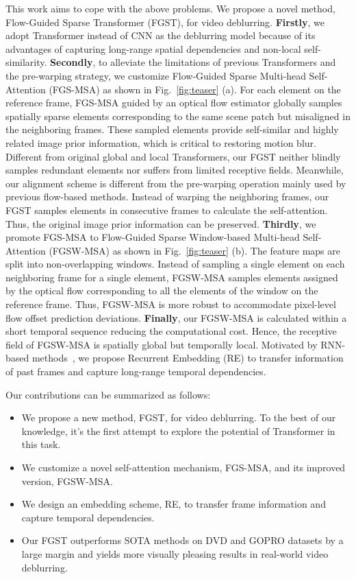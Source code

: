 \documentclass{article}
\begin{document}
	This work aims to cope with the above problems. We propose a novel method, Flow-Guided Sparse Transformer (FGST), for video deblurring. \textbf{Firstly}, we adopt Transformer instead of CNN as the deblurring model because of its advantages of capturing long-range spatial dependencies and non-local self-similarity. \textbf{Secondly}, to alleviate the limitations of previous Transformers and the pre-warping strategy, we customize Flow-Guided Sparse Multi-head Self-Attention (FGS-MSA) as shown in Fig.~\ref{fig:teaser} (a). For each  element on the reference frame, FGS-MSA guided by an optical flow estimator globally samples spatially sparse  elements corresponding to the same scene patch but misaligned in the neighboring frames. These sampled  elements provide self-similar and highly related image prior information, which is critical to restoring motion blur. Different from original global and local Transformers, our FGST neither blindly samples redundant  elements nor suffers from limited receptive fields. Meanwhile, our alignment scheme is different from the pre-warping operation mainly used by previous flow-based methods. Instead of warping the neighboring frames, our FGST samples  elements in consecutive frames to calculate the self-attention. Thus, the original image prior information can be preserved. \textbf{Thirdly}, we  promote FGS-MSA to Flow-Guided Sparse Window-based Multi-head Self-Attention (FGSW-MSA) as shown in Fig.~\ref{fig:teaser} (b). The feature maps are split into non-overlapping windows. Instead of sampling a single  element on each neighboring frame for a single  element, FGSW-MSA samples  elements assigned by the optical flow corresponding to all the  elements of the window on the reference frame. Thus, FGSW-MSA is more robust to accommodate pixel-level flow offset prediction deviations. \textbf{Finally}, our FGSW-MSA is calculated within a short temporal sequence reducing the computational cost. Hence, the receptive field of FGSW-MSA is spatially global but temporally local. Motivated by RNN-based methods~\cite{Nah,RNN_3}, we propose Recurrent Embedding (RE) to transfer information of past frames and capture long-range temporal dependencies.
	
	Our contributions can be summarized as follows:
	
	\begin{itemize}
		\setlength{\itemsep}{1pt}
		\setlength{\parsep}{1pt}
		\setlength{\parskip}{1pt}
		\vspace{-4mm}
		\item We propose a new method, FGST, for video deblurring. To the best of our knowledge, it's the first attempt to explore the potential of Transformer in this task. 
\item We customize a novel self-attention mechanism, FGS-MSA, and its improved version, FGSW-MSA.
\item We design an embedding scheme, RE, to transfer frame information and capture temporal dependencies.
\item Our FGST outperforms SOTA methods on DVD and GOPRO datasets by a large margin and yields more visually pleasing results in real-world video deblurring. 
	\end{itemize}
	
\end{document}
